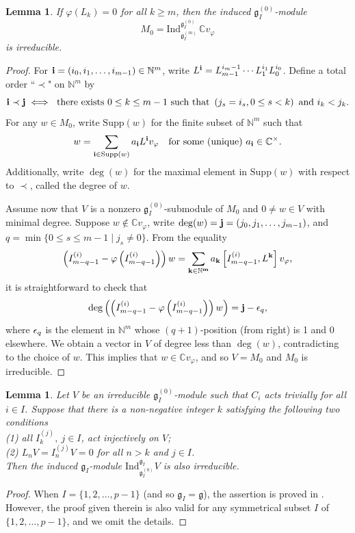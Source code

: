 \documentclass[12pt, reqno]{amsart}
\numberwithin{equation}{section}
\newtheorem{lemma}[theorem]{Lemma}%
\numberwithin{equation}{section}
\def\g{\mathfrak{g}}
\def\vf{\varphi}
\def\vvf{v_{\vf}}
\def\gi{\g_I}
\def\gizero{\gi^{(0)}}
\def\gim{\gi^{(m)}}
\def\({\left(}
\def\){\right)}
\newcommand{\C}{\mathbb C}
\newcommand{\N}{\mathbb{N}}
\def\Ind{\mathrm{Ind}}
\def\supp{\mathrm{Supp}}
\newcommand{\elei}[2]{I_{#1}^{(#2)}}
\begin{document}
\begin{lemma}\label{lem:conirr}
    If $\varphi(L_k)=0$ for all $k\ge m$, then the induced $\g_I^{(0)}$-module
    \begin{equation}\label{eq:defM0}
          M_0=\Ind_{\gim}^{\gizero}\,\C\vvf
    \end{equation}
    is irreducible.
\end{lemma}
\begin{proof}
For ${\bf{i}}=(i_0,i_1,\dots,i_{m-1})\in \N^m$, write $L^{\bf i}=L_{m-1}^{i_m-1}\cdots L_1^{i_1}L_0^{i_0}$.
Define a total order ``$\prec$" on $\N^m$ by
 $${\bf i} \prec{\bf j}\iff \text{ there exists } 0\leq k\leq m-1 \text{ such that }\(j_s=i_s, 0\leq s<k\) \text{ and }i_k<j_k.$$
For any $w\in M_0$, write $\supp (w)$ for the finite subset of $\N^m$ such that
 $$w=\sum_{{\bf i}\in \supp (w)}a_{\bf i}L^{\bf i}\vvf\quad\text{for some (unique)}\ a_{\bf i}\in \C^\times.$$
Additionally, write  $\deg(w)$ for the maximal element in $\supp(w)$ with respect to $\prec$, called the degree of $w$.

Assume now that $V$ is a nonzero $\g_I^{(0)}$-submodule of $M_0$ and $0\neq w\in V$ with minimal degree. Suppose $w\notin \C\vvf$, write $\deg(w)={\bf j}=(j_0,j_1,\dots,j_{m-1})$, and  $q=\min \{0\le s\le m-1\mid j_s\neq 0\}$.
From the equality
 $$\left(\elei {m-q-1}i-\vf\left(\elei {m-q-1}i\right)\right)w
   =\sum_{\bf k\in\N^m}a_{\bf k}\left[\elei {m-q-1}i,L^{\bf k}\right]\vvf,$$
 it is straightforward to check that
 $$\deg\left(\left(\elei {m-q-1}i-\vf\left(\elei {m-q-1}i\right)\right)w\right)={\bf j}-{\bf\epsilon}_q,$$
 where ${\bf\epsilon}_q$ is the element in $\N^m$ whose $(q+1)$-position (from right) is 1 and 0 elsewhere.
 We obtain a vector in $V$ of degree less than $\deg(w)$, contradicting to the choice of $w$.
 This implies that $w\in \C\vvf$, and so   $V=M_0$ and $M_0$ is irreducible.
\end{proof}



\begin{lemma}\label{propreszerolevelgimod}
Let $V$ be an irreducible $\g_I^{(0)}$-module such that $C_i$ acts trivially for all $i\in I$. Suppose that there is a non-negative integer $k$ satisfying the following two conditions\\
 (1) all $\elei {k}j, \ j\in I$, act injectively on $V$;\\
 (2) $L_nV=\elei {n}jV=0$ for all $n>k$ and $j\in I$.\\
 Then the induced $\g_I$-module $\mathrm{Ind}_{\g_I^{(0)}}^{\g_I}V
  $ is also irreducible.
\end{lemma}
\begin{proof}
    When $I=\{1,2,\dots,p-1\}$ (and so $\g_I=\g$), the assertion is proved in \cite[Theorem 3.4]{GX}.
   However, the proof given therein is also valid for any symmetrical subset $I$ of $\{1,2,\dots,p-1\}$, and we omit the details.
\end{proof}
\end{document}
